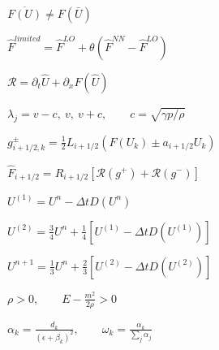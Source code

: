 \documentclass{article}
\begin{document}
\begin{preview}
\hbox{
\color[HTML]{242424}\fontsize{30}{36.0}\selectfont
$\displaystyle \overline{F(U)}\ne F(\bar U)$
}
\end{preview}
\begin{preview}
\hbox{
\color[HTML]{242424}\fontsize{27}{32.4}\selectfont
$\displaystyle \widehat F^{limited}=\widehat F^{LO}+\theta\left(\widehat F^{NN}-\widehat F^{LO}\right)$
}
\end{preview}
\begin{preview}
\hbox{
\color[HTML]{242424}\fontsize{27}{32.4}\selectfont
$\displaystyle \mathscr R=\partial_t\widehat U+\partial_xF(\widehat U)$
}
\end{preview}
\begin{preview}
\hbox{
\color[HTML]{242424}\fontsize{24}{28.799999999999997}\selectfont
$\displaystyle \lambda_j=v-c,\ v,\ v+c,\qquad c=\sqrt{\gamma p/\rho}$
}
\end{preview}
\begin{preview}
\hbox{
\color[HTML]{242424}\fontsize{24}{28.799999999999997}\selectfont
$\displaystyle g^\pm_{i+1/2,k}=\tfrac12 L_{i+1/2}\left(F(U_k)\pm a_{i+1/2}U_k\right)$
}
\end{preview}
\begin{preview}
\hbox{
\color[HTML]{242424}\fontsize{24}{28.799999999999997}\selectfont
$\displaystyle \widehat F_{i+1/2}=R_{i+1/2}\left[\mathcal R(g^+)+\mathcal R(g^-)\right]$
}
\end{preview}
\begin{preview}
\hbox{
\color[HTML]{242424}\fontsize{25}{30.0}\selectfont
$\displaystyle U^{(1)}=U^n-\Delta tD(U^n)$
}
\end{preview}
\begin{preview}
\hbox{
\color[HTML]{242424}\fontsize{24}{28.799999999999997}\selectfont
$\displaystyle U^{(2)}=\tfrac34U^n+\tfrac14\left[U^{(1)}-\Delta tD(U^{(1)})\right]$
}
\end{preview}
\begin{preview}
\hbox{
\color[HTML]{242424}\fontsize{24}{28.799999999999997}\selectfont
$\displaystyle U^{n+1}=\tfrac13U^n+\tfrac23\left[U^{(2)}-\Delta tD(U^{(2)})\right]$
}
\end{preview}
\begin{preview}
\hbox{
\color[HTML]{242424}\fontsize{25}{30.0}\selectfont
$\displaystyle \rho>0,\qquad E-\frac{m^2}{2\rho}>0$
}
\end{preview}
\begin{preview}
\hbox{
\color[HTML]{242424}\fontsize{31}{37.199999999999996}\selectfont
$\displaystyle \alpha_k=\frac{d_k}{(\epsilon+\beta_k)^2},\qquad\omega_k=\frac{\alpha_k}{\sum_j\alpha_j}$
}
\end{preview}
\end{document}
